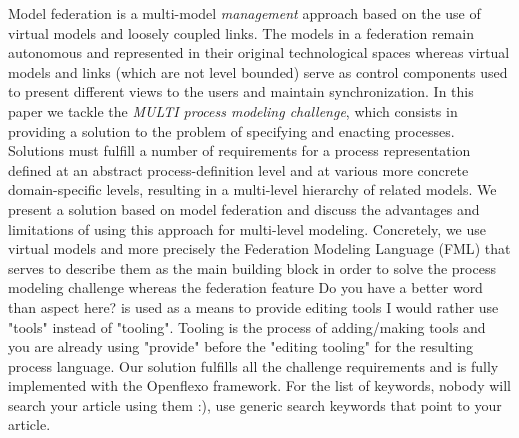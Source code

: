 Model federation is a multi-model \emph{management} approach based on the use of virtual models and loosely coupled links. The models in a federation remain autonomous and represented in their original technological spaces whereas virtual models and links (which are not level bounded) serve as control components used to present different views to the users and  maintain synchronization. In this paper we tackle the \emph{MULTI process modeling challenge}, which consists in providing a solution to the problem of specifying and enacting processes. Solutions must fulfill a number of requirements for a process representation defined at an abstract process-definition level and at various more concrete domain-specific levels, resulting in a multi-level hierarchy of related models. We present a solution based on model federation and discuss the advantages and limitations of using this approach for multi-level modeling. Concretely, we use virtual models and more precisely the Federation Modeling Language ({FML}) that serves to describe them as the main building block in order to solve the process modeling challenge whereas the federation feature {\color{red} Do you have a better word than aspect here?} is used as a means to provide editing tools {\color{red} I would rather use "tools" instead of "tooling".  Tooling is the process of adding/making tools and you are already using "provide" before the "editing tooling"} for the resulting process language. Our solution fulfills all the challenge requirements and is fully implemented with the Openflexo framework. {\color{red} For the list of keywords, nobody will search your article using them :), use generic search keywords that point to your article. }

